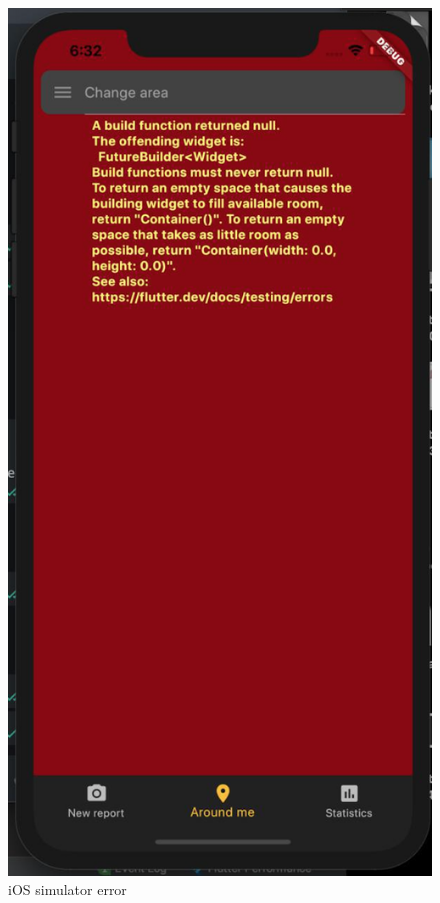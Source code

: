 \documentclass[../ATD.tex]{subfiles}
\begin{document}
    \begin{figure}[H]
        \centering
        \includegraphics{../assets/iOS_simulator_error.png}
        \caption{iOS simulator error}
    \end{figure}
\end{document}
